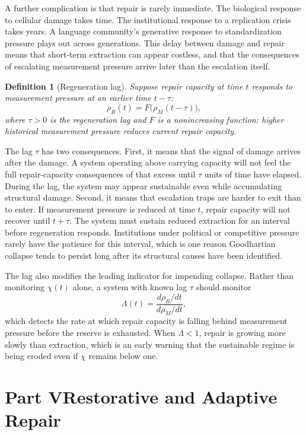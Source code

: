 \documentclass[12pt, a4paper]{article}
\theoremstyle{flyxion}
\newtheorem{definition}{Definition}
\newcommand{\rhoM}{\rho_{M}}
\newcommand{\rhoR}{\rho_{R}}
\begin{document}
A further complication is that repair is rarely immediate. The biological response to cellular damage takes time. The institutional response to a replication crisis takes years. A language community's generative response to standardization pressure plays out across generations. This delay between damage and repair means that short-term extraction can appear costless, and that the consequences of escalating measurement pressure arrive later than the escalation itself.

\begin{definition}[Regeneration lag]
Suppose repair capacity at time $t$ responds to measurement pressure at an earlier time $t - \tau$:
\[
  \rhoR(t) = F\!\bigl(\rhoM(t - \tau)\bigr),
\]
where $\tau > 0$ is the regeneration lag and $F$ is a nonincreasing function: higher historical measurement pressure reduces current repair capacity.
\end{definition}

The lag $\tau$ has two consequences. First, it means that the signal of damage arrives after the damage. A system operating above carrying capacity will not feel the full repair-capacity consequences of that excess until $\tau$ units of time have elapsed. During the lag, the system may appear sustainable even while accumulating structural damage. Second, it means that escalation traps are harder to exit than to enter. If measurement pressure is reduced at time $t$, repair capacity will not recover until $t + \tau$. The system must sustain reduced extraction for an interval before regeneration responds. Institutions under political or competitive pressure rarely have the patience for this interval, which is one reason Goodhartian collapse tends to persist long after its structural causes have been identified.

The lag also modifies the leading indicator for impending collapse. Rather than monitoring $\chi(t)$ alone, a system with known lag $\tau$ should monitor
\[
  \Lambda(t) = \frac{d\rhoR/dt}{d\rhoM/dt},
\]
which detects the rate at which repair capacity is falling behind measurement pressure before the reserve is exhausted. When $\Lambda < 1$, repair is growing more slowly than extraction, which is an early warning that the sustainable regime is being eroded even if $\chi$ remains below one.


\section*{Part V\quad Restorative and Adaptive Repair}
\end{document}
